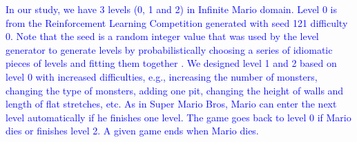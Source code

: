 \textcolor{blue}{In our study, %
we have 3 levels (0, 1 and 2) %
in Infinite Mario domain. %
Level 0 is from the Reinforcement Learning Competition generated with seed 121 difficulty 0. Note that the seed is a random integer value that was used by the level generator to generate levels by probabilistically choosing a series of idiomatic pieces of levels and fitting them together \cite{smith2009rhythm}. %
We designed level 1 and 2 based on level 0 %
with increased difficulties, e.g., increasing the number of monsters, changing the type of monsters, adding one pit, changing the height of walls and length of flat stretches, etc. As in Super Mario Bros, Mario can enter the next level automatically if he finishes one level. The game goes back to level 0 if Mario dies or finishes level 2. A given game ends when Mario dies. }%

